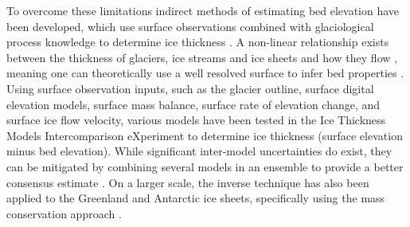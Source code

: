 \documentclass[tc, manuscript]{copernicus}
\begin{document}
To overcome these limitations indirect methods of estimating bed elevation have been developed, which use surface observations combined with glaciological process knowledge to determine ice thickness \citep[e.g.][]{vanPeltiterativeinversemethod2013}.
A non-linear relationship exists between the thickness of glaciers, ice streams and ice sheets and how they flow \citep{Raymondrelationshipsurfacebasal2005}, meaning one can theoretically use a well resolved surface to infer bed properties \citep[e.g.][]{Farinottimethodestimateice2009}.
Using surface observation inputs, such as the glacier outline, surface digital elevation models, surface mass balance, surface rate of elevation change, and surface ice flow velocity, various models have been tested in the Ice Thickness Models Intercomparison eXperiment \citep[ITMIX,][]{FarinottiHowaccurateare2017} to determine ice thickness (surface elevation minus bed elevation).
While significant inter-model uncertainties do exist, they can be mitigated by combining several models in an ensemble to provide a better consensus estimate \citep{Farinotticonsensusestimateice2019}.
On a larger scale, the inverse technique has also been applied to the Greenland \citep{MorlighemBedMachinev3Complete2017} and Antarctic \citep{MorlighemDeepglacialtroughs2019} ice sheets, specifically using the mass conservation approach \citep{Morlighemmassconservationapproach2011}.
\end{document}
